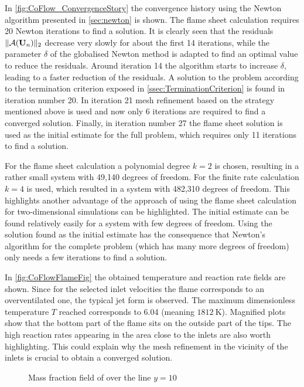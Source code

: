 In \cref{fig:CoFlow_ConvergenceStory} the convergence history using the Newton algorithm presented in \cref{sec:newton} is shown. The flame sheet calculation requires 20 Newton iterations to find a solution. It is clearly seen that the residuals $\| \mathcal{A}(\textbf{U}_{n}) \|_2 $  decrease very slowly for about the first 14 iterations, while the parameter $\delta$ of the globalised Newton method is adapted to find an optimal value to reduce the residuals. Around iteration 14 the algorithm starts to increase $\delta$, leading to a faster reduction of the residuals. A solution to the problem according to the termination criterion exposed in \cref{ssec:TerminationCriterion} is found in iteration number 20. In iteration 21 mesh refinement based on the strategy mentioned above is used and now only 6 iterations are required to find a converged solution. Finally, in iteration number 27 the flame sheet solution is used as the initial estimate for the full problem, which requires only 11 iterations to find a solution.  

For the flame sheet calculation a polynomial degree $k = 2$ is chosen, resulting in a rather small system with 49,140 degrees of freedom. For the finite rate calculation $k = 4$ is used, which resulted in a system with 482,310 degrees of freedom.  This highlights another advantage of the approach of using the flame sheet calculation for two-dimensional simulations can be highlighted. The initial estimate can be found relatively easily for a system with few degrees of freedom. Using the solution found as the initial estimate has the consequence that Newton's algorithm for the complete problem (which has many more degrees of freedom) only needs a few iterations to find a solution.

In \cref{fig:CoFlowFlameFig} the obtained temperature and reaction rate fields are shown. Since for the selected inlet velocities the flame corresponds to an overventilated one, the typical jet form is observed. The maximum dimensionless temperature $T$  reached corresponds to 6.04 (meaning $\SI{1812}{\kelvin}$). Magnified plots show that the bottom part of the flame sits on the outside part of the tips. The high reaction rates appearing in the area close to the inlets are also worth highlighting. This could explain why the mesh refinement in the vicinity of the inlets is crucial to obtain a converged solution. 

\begin{figure}[h]
	\centering
	\pgfplotsset{width=0.6\textwidth, compat=1.3}
		\caption{Mass fraction field of   over the line $y = 10$}
		\label{fig:CoFlowMF3_infiniteFinite}
	\end{figure}


